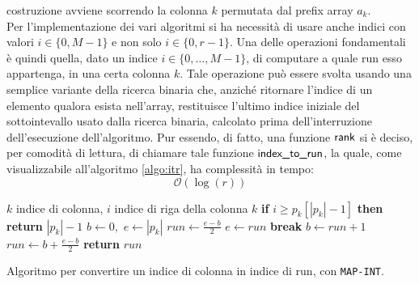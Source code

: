 costruzione 
avviene scorrendo la colonna $k$ permutata dal 
prefix array $a_k$.\\
Per
l'implementazione dei vari algoritmi si ha necessità di usare anche indici
con valori $i\in\{0, M-1\}$ e non solo $i\in\{0,r-1\}$. Una delle operazioni
fondamentali è quindi 
quella, dato un indice $i\in\{0,\ldots,M-1\}$, di computare a quale run esso
appartenga, in una certa colonna $k$. Tale operazione può essere svolta usando
una semplice variante della ricerca binaria che, anziché
ritornare l'indice di un elemento qualora esista nell'array, restituisce
l'ultimo indice iniziale del sottointevallo usato dalla ricerca binaria,
calcolato prima dell'interruzione dell'esecuzione dell'algoritmo. Pur essendo,
di fatto, una funzione $\mbox{\rm {\sf rank}}$ 
si è deciso, per comodità di lettura, di chiamare tale funzione
$\mbox{\rm {\sf index\_to\_run}}$, la quale, come visualizzabile 
all'algoritmo \ref{algo:itr}, ha complessità in tempo:
\begin{equation}
  \label{eq:itrcomp}
  \mathcal{O}(\log (r))
\end{equation}
\begin{algorithm}
  \footnotesize
  \begin{algorithmic}[1]
    \Comment $k$ indice di colonna, $i$ indice di riga della colonna $k$
    \State \textbf{if} $i\geq p_k[|p_k|-1]$ \textbf{then} \textbf{return}
    $|p_k|-1$ 
    \State $b\gets 0,\,\, e \gets |p_k|$
    \State $run\gets \frac{e-b}{2}$
    \State $e\gets run$
    \Else
    \State \textbf{break}
    \EndIf
    \State $b\gets run+1$
    \EndIf
    \State $run\gets b+\frac{e-b}{2}$
    \EndWhile
    \State \textbf{return} $run$
    \EndFunction
  \end{algorithmic}
  \caption{Algoritmo per convertire un indice di colonna in indice di run, con
    \texttt{MAP-INT}.} 
  \label{algo:itr}
\end{algorithm}

